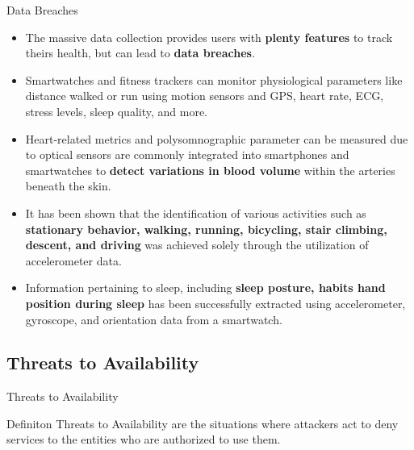 \documentclass[ucs,9pt]{beamer}
\begin{document}
\begin{frame}{Data Breaches}
	\begin{itemize}
		\item The massive data collection provides users with \textbf{plenty features} to track theirs health, but can lead to \textbf{data breaches}.
		
		\item Smartwatches and fitness trackers can monitor physiological parameters like distance walked or run using motion sensors and GPS, heart rate, ECG, stress levels, sleep quality, and more.
		
		\item Heart-related metrics and polysomnographic parameter can be measured due to optical sensors are commonly integrated into smartphones and smartwatches to \textbf{detect variations in blood volume} within the arteries beneath the skin.
		
		\item It has been shown that the identification of various activities such as \textbf{stationary behavior, walking, running, bicycling, stair climbing, descent, and driving} was achieved solely through the utilization of accelerometer data. 	
			
		\item Information pertaining to sleep, including \textbf{sleep posture, habits hand position during sleep} has been successfully extracted using accelerometer, gyroscope, and orientation data from a smartwatch. 
				
		
	\end{itemize}
\end{frame}


\subsection{Threats to Availability}

\begin{frame}{Threats to Availability}
	
	\begin{alertblock}{Definiton}
		Threats to Availability are the situations where attackers act  to deny services to the entities who are authorized to use them.
	\end{alertblock}
\end{frame}
\end{document}
